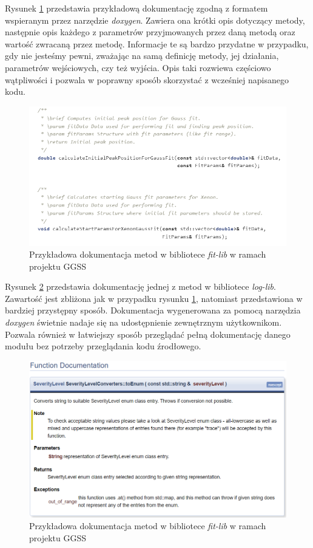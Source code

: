 Rysunek \ref{fig:code_documentation} przedstawia przykładową dokumentację zgodną z formatem wspieranym przez narzędzie \emph{doxygen}. Zawiera ona krótki opis dotyczący metody, następnie opis każdego z parametrów przyjmowanych przez daną metodą oraz wartość zwracaną przez metodę. Informacje te są bardzo przydatne w przypadku, gdy nie jesteśmy pewni, zważając na samą definicję metody, jej działania, parametrów wejściowych, czy też wyjścia. Opis taki rozwiewa częściowo wątpliwości i pozwala w poprawny sposób skorzystać z wcześniej napisanego kodu.
\begin{figure}[H]
    \centering
    \includegraphics[width=\textwidth]{components/practices_res/code_documentation}
    \caption{Przykładowa dokumentacja metod w bibliotece \emph{fit-lib} w ramach projektu GGSS}
    \label{fig:code_documentation}
\end{figure} %

Rysunek \ref{fig:doxygen} przedstawia dokumentację jednej z metod w bibliotece \emph{log-lib}. Zawartość jest zbliżona jak w przypadku rysunku \ref{fig:code_documentation}, natomiast przedstawiona w bardziej przystępny sposób. Dokumentacja wygenerowana za pomocą narzędzia \emph{doxygen} świetnie nadaje się na udostępnienie zewnętrznym użytkownikom. Pozwala również w łatwiejszy sposób przeglądać pełną dokumentację danego modułu bez potrzeby przeglądania kodu źrodłowego.

\begin{figure}[H]
    \centering
    \includegraphics[width=\textwidth]{components/practices_res/doxygen}
    \caption{Przykładowa dokumentacja metod w bibliotece \emph{fit-lib} w ramach projektu GGSS}
    \label{fig:doxygen}
\end{figure}

